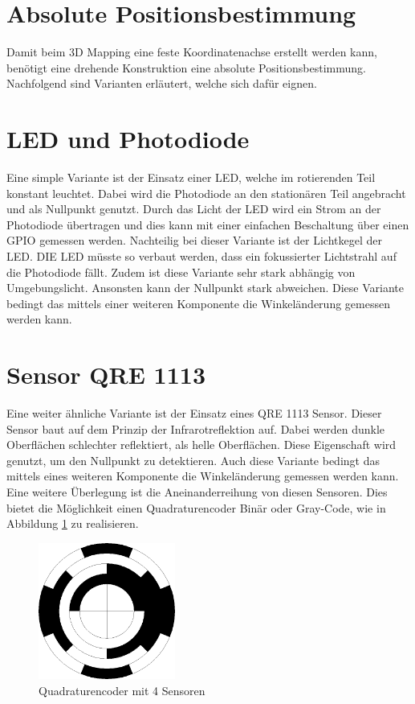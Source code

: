 \section{Absolute Positionsbestimmung}
\label{sec:position}
Damit beim 3D Mapping eine feste Koordinatenachse erstellt werden kann, benötigt eine drehende Konstruktion eine absolute Positionsbestimmung. Nachfolgend sind Varianten erläutert, welche sich dafür eignen.

\section{LED und Photodiode }
Eine simple Variante ist der Einsatz einer LED, welche im rotierenden Teil konstant leuchtet. Dabei wird die Photodiode an den stationären Teil angebracht und als Nullpunkt genutzt. Durch das Licht der LED wird ein Strom an der Photodiode übertragen und dies kann mit einer einfachen Beschaltung über einen GPIO gemessen werden. Nachteilig bei dieser Variante ist der Lichtkegel der LED. DIE LED müsste so verbaut werden, dass ein fokussierter Lichtstrahl auf die Photodiode fällt. Zudem ist diese Variante sehr stark abhängig von Umgebungslicht. Ansonsten kann der Nullpunkt stark abweichen. Diese Variante bedingt das mittels einer weiteren Komponente die Winkeländerung gemessen werden kann.

\section{Sensor QRE 1113}
Eine weiter ähnliche Variante ist der Einsatz eines QRE 1113 Sensor. Dieser Sensor baut auf dem Prinzip der Infrarotreflektion auf. Dabei werden dunkle Oberflächen schlechter reflektiert, als helle Oberflächen. Diese Eigenschaft wird genutzt, um den Nullpunkt zu detektieren. Auch diese Variante bedingt das mittels eines weiteren Komponente die Winkeländerung gemessen werden kann.
Eine weitere Überlegung ist die Aneinanderreihung von diesen Sensoren. Dies bietet die Möglichkeit einen Quadraturencoder Binär oder Gray-Code, wie in Abbildung \ref{fig:Encoder} zu realisieren.

\begin{figure}[H]
	\centering
	\includegraphics[width=0.4\textwidth]{resources/encoder.png}
	\caption[Quadraturencoder mit 4 Sensoren]{Quadraturencoder mit 4 Sensoren}
	\label{fig:Encoder}
\end{figure} 

